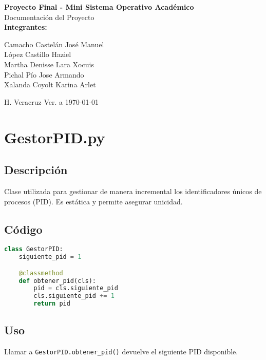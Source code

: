 \documentclass[11pt]{article}
\begin{document}
\begin{titlepage}
    \centering
    \vspace*{1cm}
    {\Huge\bfseries Proyecto Final - Mini Sistema Operativo Académico \\[0.5cm]}
    {\Large Documentación del Proyecto\\[1.5cm]}
    \textbf{Integrantes:}
    \begin{flushleft}
        Camacho Castelán José Manuel \vspace{0.3cm}\\
        López Castillo Haziel \vspace{0.3cm}\\
        Martha Denisse Lara Xocuis \vspace{0.3cm}\\
        Pichal Pío Jose Armando \vspace{0.3cm}\\
        Xalanda Coyolt Karina Arlet \vspace{0.3cm}
    \end{flushleft}
    \vfill
    { \large H. Veracruz Ver. a \today}
\end{titlepage}

\tableofcontents
\newpage

\section{GestorPID.py}

\subsection{Descripción}
Clase utilizada para gestionar de manera incremental los identificadores únicos de procesos (PID). Es estática y permite asegurar unicidad.

\subsection{Código}
\begin{lstlisting}[language=Python, caption={GestorPID.py}]
class GestorPID:
    siguiente_pid = 1

    @classmethod
    def obtener_pid(cls):
        pid = cls.siguiente_pid
        cls.siguiente_pid += 1
        return pid
\end{lstlisting}

\subsection{Uso}
Llamar a \texttt{GestorPID.obtener\_pid()} devuelve el siguiente PID disponible.
\end{document}
